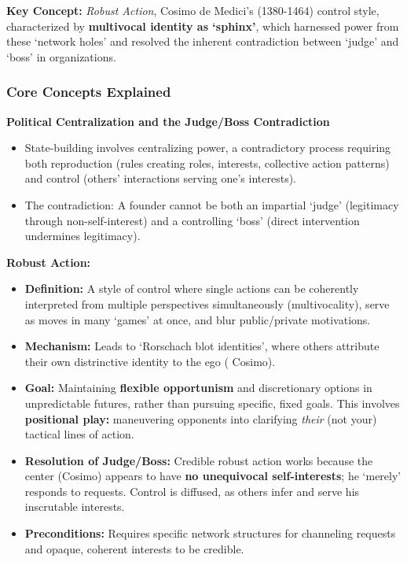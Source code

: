 \documentclass{article}
\begin{document}
    \noindent \textbf{Key Concept:} \textit{Robust Action}, Cosimo de
Medici's (1380-1464) control style, characterized by
\textbf{multivocal identity as `sphinx'}, which harnessed power from these
`network holes' and resolved the inherent contradiction between `judge' and
`boss' in organizations.

    \subsubsection{Core Concepts Explained}

    \noindent \textbf{Political Centralization and the Judge/Boss Contradiction}
    \begin{itemize}
        \item State-building involves centralizing power, a contradictory
        process requiring both reproduction (rules creating roles,
        interests, collective action patterns) and control (others'
        interactions serving one's interests).
        \item The contradiction: A founder cannot be both an impartial
        `judge' (legitimacy through non-self-interest) and a controlling
        `boss' (direct intervention undermines legitimacy).
    \end{itemize}

    \noindent \textbf{Robust Action:}
    \begin{itemize}
        \item \textbf{Definition:} A style of control where single actions
        can be coherently interpreted from multiple perspectives
        simultaneously (multivocality), serve as moves in many `games' at
        once, and blur public/private motivations.
        \item \textbf{Mechanism:} Leads to `Rorschach blot identities',
        where others attribute their own distrinctive identity to the ego (
        Cosimo).
        \item \textbf{Goal:} Maintaining \textbf{flexible opportunism} and
        discretionary options in unpredictable futures, rather than pursuing
        specific, fixed goals. This involves \textbf{positional play:}
        maneuvering opponents into clarifying \textit{their} (not your)
        tactical lines of action.
        \item \textbf{Resolution of Judge/Boss:} Credible robust action
        works because the center (Cosimo) appears to have
        \textbf{no unequivocal self-interests}; he `merely' responds to
        requests. Control is diffused, as others infer and serve his
        inscrutable interests.
        \item \textbf{Preconditions:} Requires specific network structures
        for channeling requests and opaque, coherent interests to be credible.
    \end{itemize}
\end{document}

